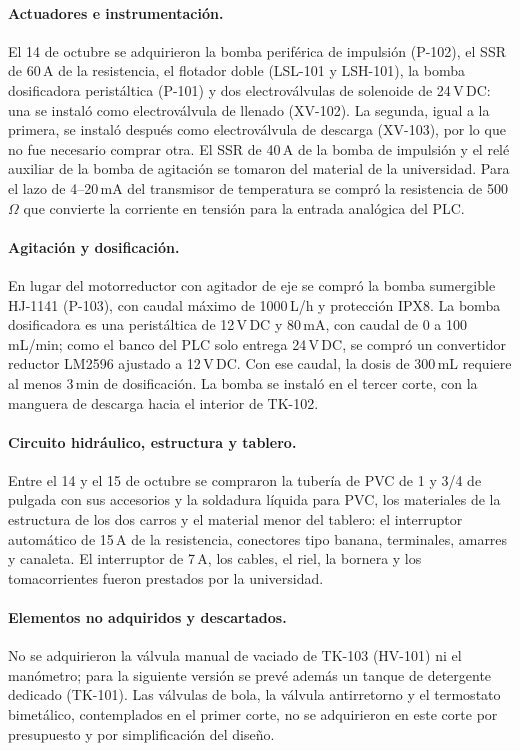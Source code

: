 \paragraph{Actuadores e instrumentación.} El 14 de octubre se adquirieron la bomba periférica de impulsión (P-102), el SSR de 60\,A de la resistencia, el flotador doble (LSL-101 y LSH-101), la bomba dosificadora peristáltica (P-101) y dos electroválvulas de solenoide de 24\,V\,DC: una se instaló como electroválvula de llenado (XV-102). La segunda, igual a la primera, se instaló después como electroválvula de descarga (XV-103), por lo que no fue necesario comprar otra. El SSR de 40\,A de la bomba de impulsión y el relé auxiliar de la bomba de agitación se tomaron del material de la universidad. Para el lazo de 4--20\,mA del transmisor de temperatura se compró la resistencia de 500\,$\Omega$ que convierte la corriente en tensión para la entrada analógica del PLC.

\paragraph{Agitación y dosificación.} En lugar del motorreductor con agitador de eje se compró la bomba sumergible HJ-1141 (P-103), con caudal máximo de 1000\,L/h y protección IPX8. La bomba dosificadora es una peristáltica de 12\,V\,DC y 80\,mA, con caudal de 0 a 100\,mL/min; como el banco del PLC solo entrega 24\,V\,DC, se compró un convertidor reductor LM2596 ajustado a 12\,V\,DC. Con ese caudal, la dosis de 300\,mL requiere al menos 3\,min de dosificación. La bomba se instaló en el tercer corte, con la manguera de descarga hacia el interior de TK-102.

\paragraph{Circuito hidráulico, estructura y tablero.} Entre el 14 y el 15 de octubre se compraron la tubería de PVC de 1 y 3/4 de pulgada con sus accesorios y la soldadura líquida para PVC, los materiales de la estructura de los dos carros y el material menor del tablero: el interruptor automático de 15\,A de la resistencia, conectores tipo banana, terminales, amarres y canaleta. El interruptor de 7\,A, los cables, el riel, la bornera y los tomacorrientes fueron prestados por la universidad.

\paragraph{Elementos no adquiridos y descartados.} No se adquirieron la válvula manual de vaciado de TK-103 (HV-101) ni el manómetro; para la siguiente versión se prevé además un tanque de detergente dedicado (TK-101). Las válvulas de bola, la válvula antirretorno y el termostato bimetálico, contemplados en el primer corte, no se adquirieron en este corte por presupuesto y por simplificación del diseño.
